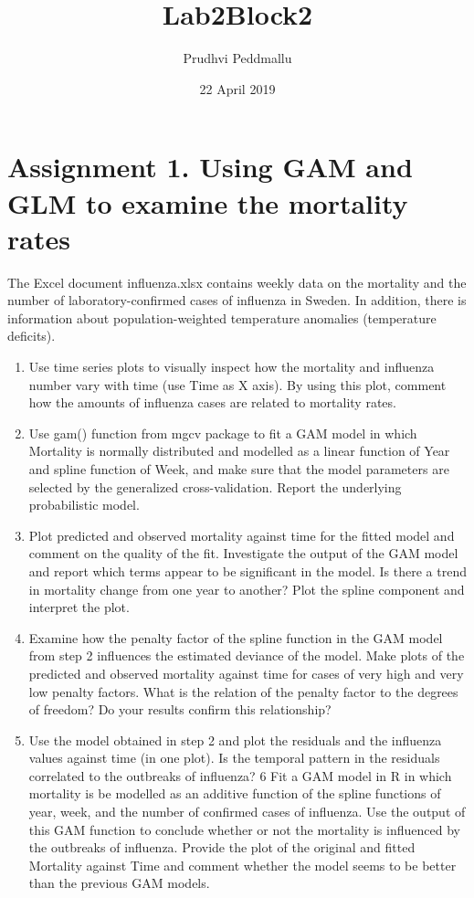 \documentclass[]{article}
\title{Lab2Block2}
\author{Prudhvi Peddmallu}
\date{22 April 2019}
\providecommand{\tightlist}{%
  \setlength{\itemsep}{0pt}\setlength{\parskip}{0pt}}
\begin{document}
\maketitle

\section{Assignment 1. Using GAM and GLM to examine the mortality
rates}\label{assignment-1.-using-gam-and-glm-to-examine-the-mortality-rates}

The Excel document influenza.xlsx contains weekly data on the mortality
and the number of laboratory-confirmed cases of influenza in Sweden. In
addition, there is information about population-weighted temperature
anomalies (temperature deficits).

\begin{enumerate}
\def\labelenumi{\arabic{enumi}.}
\tightlist
\item
  Use time series plots to visually inspect how the mortality and
  influenza number vary with time (use Time as X axis). By using this
  plot, comment how the amounts of influenza cases are related to
  mortality rates.
\item
  Use gam() function from mgcv package to fit a GAM model in which
  Mortality is normally distributed and modelled as a linear function of
  Year and spline function of Week, and make sure that the model
  parameters are selected by the generalized cross-validation. Report
  the underlying probabilistic model.
\item
  Plot predicted and observed mortality against time for the fitted
  model and comment on the quality of the fit. Investigate the output of
  the GAM model and report which terms appear to be significant in the
  model. Is there a trend in mortality change from one year to another?
  Plot the spline component and interpret the plot.
\item
  Examine how the penalty factor of the spline function in the GAM model
  from step 2 influences the estimated deviance of the model. Make plots
  of the predicted and observed mortality against time for cases of very
  high and very low penalty factors. What is the relation of the penalty
  factor to the degrees of freedom? Do your results confirm this
  relationship?
\item
  Use the model obtained in step 2 and plot the residuals and the
  influenza values against time (in one plot). Is the temporal pattern
  in the residuals correlated to the outbreaks of influenza? 6 Fit a GAM
  model in R in which mortality is be modelled as an additive function
  of the spline functions of year, week, and the number of confirmed
  cases of influenza. Use the output of this GAM function to conclude
  whether or not the mortality is influenced by the outbreaks of
  influenza. Provide the plot of the original and fitted Mortality
  against Time and comment whether the model seems to be better than the
  previous GAM models.
\end{enumerate}
\end{document}

